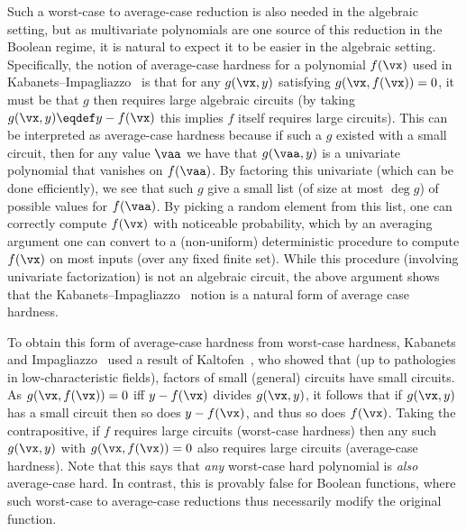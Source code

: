 \documentclass{toc}
\begin{document}
Such a worst-case to average-case reduction is also needed in the algebraic setting, but as multivariate polynomials are one source of this reduction in the Boolean regime, it is natural to expect it to be easier in the algebraic setting. Specifically, the notion of average-case hardness for a polynomial $f(\vx)$ used in Kabanets--Impagliazzo~\cite{KabanetsImpagliazzo04} is that for any $g(\vx,y)$ satisfying $g(\vx,f(\vx))=0$, it must be that $g$ then requires large algebraic circuits (by taking $g(\vx,y)\eqdef y-f(\vx)$ this implies $f$ itself requires large circuits).  This can be interpreted as average-case hardness because if such a $g$ existed with a small circuit, then for any value $\vaa$ we have that $g(\vaa,y)$ is a univariate polynomial that vanishes on $f(\vaa)$. By factoring this univariate (which can be done efficiently), we see that such $g$ give a small list (of size at most $\deg g$) of possible values for $f(\vaa)$. By picking a random element from this list, one can correctly compute $f(\vx)$ with noticeable probability, which by an averaging argument one can convert to a (non-uniform) deterministic procedure to compute $f(\vx)$ on most inputs (over any fixed finite set).  While this procedure (involving univariate factorization) is not an algebraic circuit, the above argument shows that the Kabanets--Impagliazzo~\cite{KabanetsImpagliazzo04} notion is a natural form of average case hardness.

To obtain this form of average-case hardness from worst-case hardness, Kabanets and Impagliazzo~\cite{KabanetsImpagliazzo04} used a result of Kaltofen~\cite{Kaltofen89}, who showed that (up to pathologies in low-characteristic fields), factors of small (general) circuits have small circuits.  As $g(\vx,f(\vx))=0$ iff $y-f(\vx)$ divides $g(\vx,y)$, it follows that if $g(\vx,y)$ has a small circuit then so does $y-f(\vx)$, and thus so does $f(\vx)$.  Taking the contrapositive, if $f$ requires large circuits (worst-case hardness) then any such $g(\vx,y)$ with $g(\vx,f(\vx))=0$ also requires large circuits (average-case hardness). Note that this says that \emph{any} worst-case hard polynomial is \emph{also} average-case hard.  In contrast, this is provably false for Boolean functions, where such worst-case to average-case reductions thus necessarily modify the original function.
\end{document}
